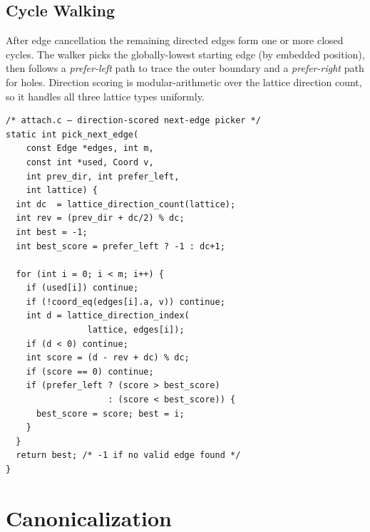 \documentclass[10pt,a4paper]{article}
\let\polysection\section
\renewcommand\section{\needspace{0.16\textheight}\polysection}
\let\polysubsection\subsection
\renewcommand\subsection{\needspace{0.12\textheight}\polysubsection}
\newcommand{\file}[1]{\texttt{\footnotesize #1}}
\begin{document}
\subsection{Cycle Walking}

\begin{tcolorbox}[dualbox, title=Directed Cycle Extraction — \file{src/core/attach.c}]
  After edge cancellation the remaining directed edges form one or more
  closed cycles.  The walker picks the globally-lowest starting edge
  (by embedded position), then follows a \emph{prefer-left} path to
  trace the outer boundary and a \emph{prefer-right} path for holes.
  Direction scoring is modular-arithmetic over the lattice direction
  count, so it handles all three lattice types uniformly.
\tcblower
\begin{verbatim}
/* attach.c — direction-scored next-edge picker */
static int pick_next_edge(
    const Edge *edges, int m,
    const int *used, Coord v,
    int prev_dir, int prefer_left,
    int lattice) {
  int dc  = lattice_direction_count(lattice);
  int rev = (prev_dir + dc/2) % dc;
  int best = -1;
  int best_score = prefer_left ? -1 : dc+1;

  for (int i = 0; i < m; i++) {
    if (used[i]) continue;
    if (!coord_eq(edges[i].a, v)) continue;
    int d = lattice_direction_index(
                lattice, edges[i]);
    if (d < 0) continue;
    int score = (d - rev + dc) % dc;
    if (score == 0) continue;
    if (prefer_left ? (score > best_score)
                    : (score < best_score)) {
      best_score = score; best = i;
    }
  }
  return best; /* -1 if no valid edge found */
}
\end{verbatim}
\end{tcolorbox}

\section{Canonicalization}
\end{document}
